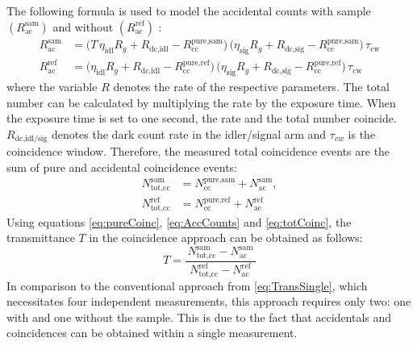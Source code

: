 The following formula is used to model the accidental counts with sample $\left(R_{\text{ac}}^{\text{sam}} \right)$ and without $\left(R_{\text{ac}}^{\text{ref}} \right)$ \cite{hayatTheoryPhotonCoincidence1999}:
\begin{equation}
	\begin{aligned}
		R_{\text{ac}}^{\text{sam}} 
		&= \Big( T\,\eta_{\text{idl}} R_g + R_{\text{dc,idl}} - R_{\text{cc}}^{\text{pure,sam}} \Big) \,
		\Big( \eta_{\text{sig}} R_g + R_{\text{dc,sig}} - R_{\text{cc}}^{\text{pure,sam}} \Big) \,
		\tau_{\text{cw}} \\[0.75em]
		R_{\text{ac}}^{\text{ref}} 
		&= \Big( \eta_{\text{idl}} R_g + R_{\text{dc,idl}} - R_{\text{cc}}^{\text{pure,ref}} \Big) \,
		\Big( \eta_{\text{sig}} R_g + R_{\text{dc,sig}} - R_{\text{cc}}^{\text{pure,ref}} \Big) \,
		\tau_{\text{cw}}
	\end{aligned}
	\label{eq:AccCounts}
\end{equation}
where the variable $R$ denotes the rate of the respective parameters. The total number can be calculated by multiplying the rate by the exposure time. When the exposure time is set to one second, the rate and the total number coincide. $R_{\text{dc,idl/sig}}$ denotes the dark count rate in the idler/signal arm and $\tau_{cw}$ is the coincidence window.\newline
Therefore, the measured total coincidence events are the sum of pure and accidental coincidence events:
\begin{equation}
	\begin{aligned}
		N_{\text{tot,cc}}^{\text{sam}} &= N_{\text{cc}}^{\text{pure,sam}} + N_{\text{ac}}^{\text{sam}}, \\[0.5em]
		N_{\text{tot,cc}}^{\text{ref}} &= N_{\text{cc}}^{\text{pure,ref}} + N_{\text{ac}}^{\text{ref}}
	\end{aligned}
	\label{eq:totCoinc}
\end{equation}
Using equations \ref{eq:pureCoinc}, \ref{eq:AccCounts} and \ref{eq:totCoinc}, the transmittance $T$ in the coincidence approach can be obtained as follows:
\begin{equation}
	T = 
	\frac{\,N_{\text{tot,cc}}^{\text{sam}} - N_{\text{ac}}^{\text{sam}}\,}
	{\,N_{\text{tot,cc}}^{\text{ref}} - N_{\text{ac}}^{\text{ref}}\,}
	\label{eq:TransCoinc}
\end{equation}
In comparison to the conventional approach from \autoref{eq:TransSingle}, which necessitates four independent measurements, this approach requires only two: one with and one without the sample. This is due to the fact that  accidentals and coincidences can be obtained within a single measurement. \newline
